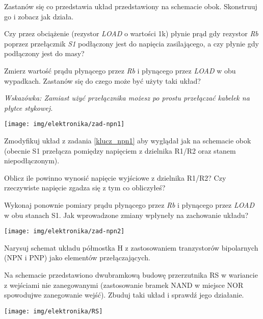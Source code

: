 
\dbEntryCheckResults
\noindent\begin{minipage}[b]{0.6\textwidth}
Zastanów się co przedstawia układ przedstawiony na schemacie obok. Skonstruuj go i zobacz jak działa.

Czy przez obciążenie (rezystor \textit{LOAD} o wartości 1k) płynie prąd gdy rezystor \textit{Rb} poprzez przełącznik \textit{S1} podłączony jest do napięcia zasilającego, a czy płynie gdy podłączony jest do masy?

Zmierz wartość prądu płynącego przez \textit{Rb} i płynącego przez \textit{LOAD} w obu wypadkach. Zastanów się do czego może być użyty taki układ?

\textit{Wskazówka: Zamiast użyć przełącznika możesz po prostu przełączać kabelek na płytce stykowej.}
\end{minipage}
\hfill
\begin{minipage}[b]{0.35\textwidth}
\texttt{[image: img/elektronika/zad-npn1]}
\end{minipage}
\fi

\dbEntryCheckResults
\noindent\begin{minipage}[b]{0.5\textwidth}
Zmodyfikuj układ z zadania \ref{klucz_npn1} aby wyglądał jak na schemacie obok (obecnie S1 przełącza pomiędzy napięciem z dzielnika R1/R2 oraz stanem niepodłączonym).

Oblicz ile powinno wynosić napięcie wyjściowe z dzielnika R1/R2? Czy rzeczywiste napięcie zgadza się z tym co obliczyłeś?

Wykonaj ponownie pomiary prądu płynącego przez \textit{Rb} i płynącego przez \textit{LOAD} w obu stanach S1.
Jak wprowadzone zmiany wpłyneły na zachowanie układu?
\end{minipage}
\hfill
\begin{minipage}[b]{0.45\textwidth}
\texttt{[image: img/elektronika/zad-npn2]}
\end{minipage}
\fi

\dbEntryCheckResults
Narysuj schemat układu półmostka H z zastosowaniem tranzystorów bipolarnych (NPN i PNP) jako elementów przełączających.
\fi



\dbEntryCheckResults
\noindent\begin{minipage}[b]{0.6\textwidth}
Na schemacie przedstawiono dwubramkową budowę przerzutnika RS w wariancie z wejściami nie zanegowanymi (zastosowanie bramek NAND w miejsce NOR spowodujwe zanegowanie wejść). Zbuduj taki układ i sprawdź jego działanie.
\end{minipage}
\hfill
\begin{minipage}[b]{0.35\textwidth}
\texttt{[image: img/elektronika/RS]}
\end{minipage}
\fi

